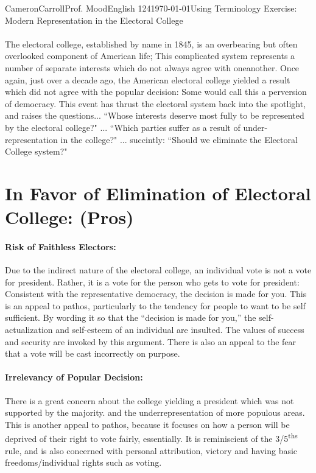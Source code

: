 \documentclass[12pt,letterpaper]{article}
\begin{document}
\begin{mla}{Cameron}{Carroll}{Prof. Mood}{English 124}{\today}{Using Terminology Exercise: Modern Representation in the Electoral College}
\singlespacing
\paragraph{}
The electoral college, established by name in 1845, is an overbearing but often overlooked component of American life; This complicated system represents a number of separate interests which do not always agree with oneanother. Once again, just over a decade ago, the American electoral college yielded a result which did not agree with the popular decision: Some would call this a perversion of democracy. This event has thrust the electoral system back into the spotlight, and raises the questions... ``Whose interests deserve most fully to be represented by the electoral college?" ... ``Which parties suffer as a result of under-representation in the college?" ... succintly: ``Should we eliminate  the Electoral College system?"




\section*{In Favor of Elimination of Electoral College: (Pros)}


\paragraph{Risk of Faithless Electors:}
Due to the indirect nature of the electoral college, an individual vote is not a vote for president. Rather, it is a vote for the person who gets to vote for president: Consistent with the representative democracy, the decision is made for you. This is an appeal to pathos, particularly to the tendency for people to want to be self sufficient. By wording it so that the ``decision is made for you,'' the self-actualization and self-esteem of an individual are insulted. The values of success and security are invoked by this argument. There is also an appeal to the fear that a vote will be cast incorrectly on purpose.                                     


\paragraph{Irrelevancy of Popular Decision:}
There is a great concern about the college yielding a president which was not supported by the majority. and the underrepresentation of more populous areas. This is another appeal to pathos, because it focuses on how a person will be deprived of their right to vote fairly, essentially. It is reminiscient of the 3/5\textsuperscript{ths} rule, and is also concerned with personal attribution, victory and having basic freedoms/individual rights such as voting.


\end{mla}
\end{document}

